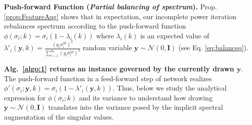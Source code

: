 

\begin{tcolorbox}[width=1.0\linewidth, colframe=blackish, colback=beaublue, boxsep=0mm, arc=2mm, left=2mm, right=2mm, top=2mm, bottom=2mm]
\noindent\textbf{Push-forward Function (\textit{Partial balancing of spectrum}).} Prop. \ref{prop:FeatureAug} shows that in expectation, our incomplete power iteration rebalances spectrum according to the push-forward function  $\phi(\sigma_i;k)=\sigma_i(1\!-\!\lambda_i(k))$ where $\lambda_i(k)$ is an expected value of $\lambda'_i(\mathbf{y},k)=\frac{\left(y_{i} \sigma_{i}^{2k}\right)^{2}}{ \sum_{l=1}^{d_h}\left(y_{l} \sigma_{l}^{2k}\right)^{2}}$ \wrt  random variable $\mathbf{y}\!\sim\!\mathcal{N}(0, \mathbf{I})$ (see Eq. \eqref{eq:balanceq}). 
\end{tcolorbox}

\begin{tcolorbox}[width=1.0\linewidth, colframe=blackish, colback=beaublue, boxsep=0mm, arc=2mm, left=2mm, right=2mm, top=2mm, bottom=2mm]
\textbf{Alg.~\ref{algo:1} returns an instance governed by the currently drawn $\mathbf{y}$}. The push-forward function in a feed-forward step of network realizes $\phi'(\sigma_i;\mathbf{y},k)=\sigma_i(1-\lambda'_i(\mathbf{y},k))$. Thus, below we study the analytical expression for $\phi(\sigma_i;k)$ and its variance to understand how drawing $\mathbf{y}\!\sim\!\mathcal{N}(0, \mathbf{I})$ translates into the variance posed by the implicit spectral augmentation of the singular values.
\end{tcolorbox}



